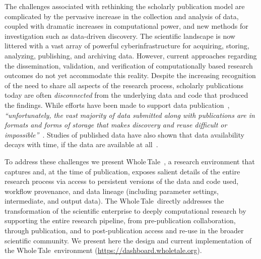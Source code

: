 \documentclass[review]{elsarticle}
\newcommand{\wt}{Whole\,Tale}
\begin{document}
The challenges associated with rethinking the scholarly publication model are complicated by
the pervasive increase in the collection and analysis of data, coupled with dramatic increases 
in computational power, and new methods for investigation such as data-driven discovery. 
The scientific landscape is now littered with a vast array of powerful
cyberinfrastructure for acquiring, storing, analyzing, publishing, and archiving data. However, current approaches regarding the dissemination, validation, and verification of computationally based 
research outcomes do not yet accommodate this reality. 
Despite the increasing recognition of the need to share all aspects of the research process, 
scholarly publications today are often \emph{disconnected} from the underlying data and code 
that produced the findings. While efforts have been made to support data publication~\cite{dataverse,figshare,chard15publication}, 
\emph{``unfortunately, the vast majority of data submitted along with 
publications are in formats and forms of storage that makes discovery and reuse difficult or 
impossible''}~\cite{copdess}. Studies of published data have also shown
that data availability decays with time, if the data are available at all~\cite{views14decline}.

To address these challenges we present \wt~\cite{ludascher16wt}, a research environment that captures and, at the time of publication, exposes salient details of the entire research process via access to persistent versions of the data and code used, workflow provenance, and data lineage (including parameter settings, intermediate, and output data). The \wt\ directly addresses the transformation of the scientific enterprise to deeply computational research by supporting the entire 
research pipeline, from pre-publication collaboration, through publication, and to post-publication 
access and re-use in the broader scientific community.
We present here the design and current implementation of the \wt\ environment (\url{https://dashboard.wholetale.org}).

\end{document}
